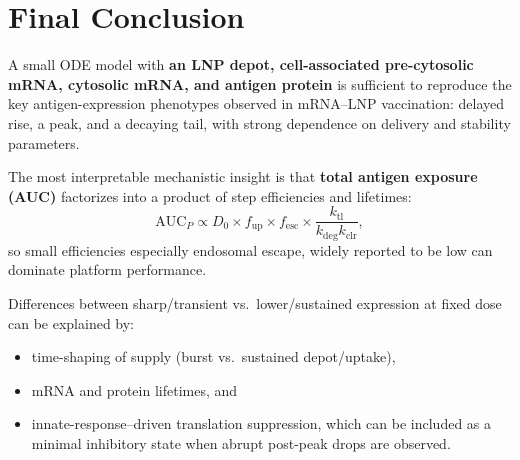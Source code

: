 \section{Final Conclusion}

A small ODE model with \textbf{an LNP depot, cell-associated pre-cytosolic mRNA, cytosolic mRNA, and antigen protein} is sufficient to reproduce the key antigen-expression phenotypes observed in mRNA--LNP vaccination: delayed rise, a peak, and a decaying tail, with strong dependence on delivery and stability parameters.

The most interpretable mechanistic insight is that \textbf{total antigen exposure (AUC)} factorizes into a product of step efficiencies and lifetimes:
\begin{equation}
\mathrm{AUC}_P \propto D_0 \times f_{\mathrm{up}} \times f_{\mathrm{esc}} \times \frac{k_{\mathrm{tl}}}{k_{\mathrm{deg}}k_{\mathrm{clr}}},
\end{equation}
so small efficiencies \textemdash{} especially endosomal escape, widely reported to be low \textemdash{} can dominate platform performance.

Differences between sharp/transient vs.~lower/sustained expression at fixed dose can be explained by:
\begin{itemize}
    \item time-shaping of supply (burst vs.~sustained depot/uptake),
    \item mRNA and protein lifetimes, and
    \item innate-response--driven translation suppression, which can be included as a minimal inhibitory state when abrupt post-peak drops are observed.
\end{itemize}
